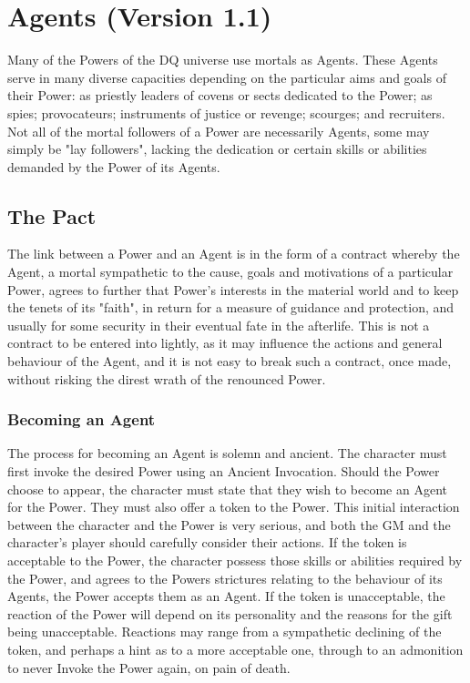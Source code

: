 \section{Agents (Version 1.1)}

Many of the Powers of the DQ universe use mortals as Agents.  These
Agents serve in many diverse capacities depending on the particular
aims and goals of their Power: as priestly leaders of covens or sects
dedicated to the Power; as spies; provocateurs; instruments of justice
or revenge; scourges; and recruiters.  Not all of the mortal followers
of a Power are necessarily Agents, some may simply be "lay followers",
lacking the dedication or certain skills or abilities demanded by the
Power of its Agents.

\subsection{The Pact}

The link between a Power and an Agent is in the form of a contract
whereby the Agent, a mortal sympathetic to the cause, goals and
motivations of a particular Power, agrees to further that Power's
interests in the material world and to keep the tenets of its "faith",
in return for a measure of guidance and protection, and usually for
some security in their eventual fate in the afterlife.  This is not a
contract to be entered into lightly, as it may influence the actions
and general behaviour of the Agent, and it is not easy to break such a
contract, once made, without risking the direst wrath of the renounced
Power.

\subsubsection{Becoming an Agent}
The process for becoming an Agent is solemn and ancient.  The
character must first invoke the desired Power using an Ancient
Invocation.  Should the Power choose to appear, the character must
state that they wish to become an Agent for the Power.  They must also
offer a token to the Power.  This initial interaction between the
character and the Power is very serious, and both the GM and the
character's player should carefully consider their actions.  If the
token is acceptable to the Power, the character possess those skills
or abilities required by the Power, and agrees to the Powers
strictures relating to the behaviour of its Agents, the Power accepts
them as an Agent.  If the token is unacceptable, the reaction of the
Power will depend on its personality and the reasons for the gift
being unacceptable.  Reactions may range from a sympathetic declining
of the token, and perhaps a hint as to a more acceptable one, through
to an admonition to never Invoke the Power again, on pain of death.

